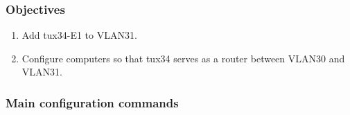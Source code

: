 \documentclass[a4paper, 11pt]{report}
\begin{document}
\subsubsection{Objectives} \label{sec:Obj3}

\begin{enumerate}
    \item Add tux34-E1 to VLAN31.
    \item Configure computers so that tux34 serves as a router between VLAN30 and VLAN31.
\end{enumerate}

\subsubsection{Main configuration commands} \label{sec:Com3}
\end{document}
